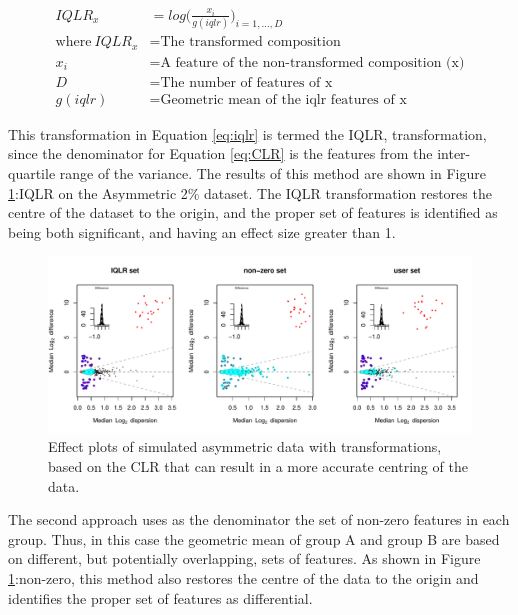 \documentclass [10pt]{article}
\begin{document}
\begin{equation}
\begin{split}
IQLR_x &= log  \big( \frac{x_i}{g(iqlr)}   \big)_{i=1,\dots,D} \\
\text{where}~
	IQLR_x &= \text{The transformed composition} \\
	x_i &= \text{A feature of the non-transformed composition (x)} \\
	D &= \text{The number of features of x} \\ 
	g(iqlr) &= \text{Geometric mean of the iqlr features of x}
\end{split}
\label{eq:iqlr}
\end{equation}



This transformation in Equation \ref{eq:iqlr} is termed the IQLR, transformation, since the denominator for Equation \ref{eq:CLR} is the features from the inter-quartile range of the variance. The results of this method are shown in Figure \ref{Fig:f2a}:IQLR on the Asymmetric 2\% dataset. The IQLR transformation restores the centre of the dataset to the origin, and the proper set of features is identified as being both significant, and having an effect size greater than 1.

\begin{figure}[ht]
\includegraphics[width=6in]{../figures/Fig_2.pdf}
\vspace{3mm} \caption{Effect plots of simulated asymmetric data with transformations, based on the CLR that can result in a more accurate centring of the data.   }
\label{Fig:f2a}
\end{figure}

The second approach uses as the denominator the set of non-zero features in each group.  Thus, in this case the geometric mean of group A and group B are based on different, but potentially overlapping, sets of features. As shown in Figure \ref{Fig:f2a}:non-zero, this method also restores the centre of the data to the origin and identifies the proper set of features as differential. 
\end{document}
